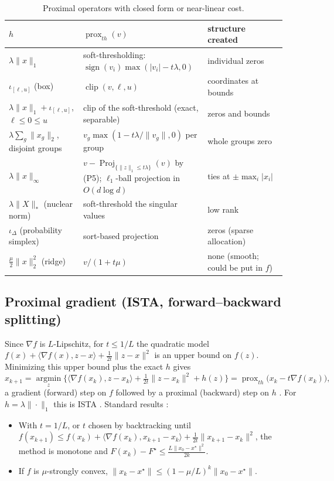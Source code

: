 \documentclass[10pt]{article}
\newcommand{\prox}{\operatorname{prox}}
\newcommand{\proj}{\operatorname{Proj}}
\theoremstyle{remark}
\begin{document}
\begin{table}[h]
\centering\small
\begin{tabular}{@{}L{0.25\linewidth}L{0.42\linewidth}L{0.27\linewidth}@{}}
\toprule
$h$ & $\prox_{th}(v)$ & structure created\\\midrule
$\lambda\|x\|_1$ \citep{tibshirani1996lasso} & soft-thresholding: $\operatorname{sign}(v_i)\max(|v_i|-t\lambda,0)$ & individual zeros\\
$\iota_{[\ell,u]}$ (box) & $\operatorname{clip}(v,\ell,u)$ & coordinates at bounds\\
$\lambda\|x\|_1+\iota_{[\ell,u]}$, $\ell\le0\le u$ & clip of the soft-threshold (exact, separable) & zeros and bounds\\
$\lambda\sum_g\|x_g\|_2$, disjoint groups \citep{yuan2006group} & $v_g\max(1-t\lambda/\|v_g\|,0)$ per group & whole groups zero\\
$\lambda\|x\|_\infty$ & $v-\proj_{\{\|z\|_1\le t\lambda\}}(v)$ by (P5); $\ell_1$-ball projection in $O(d\log d)$ \citep{duchi2008l1ball} & ties at $\pm\max_i|x_i|$\\
$\lambda\|X\|_*$ (nuclear norm) & soft-threshold the singular values \citep{cai2010svt} & low rank\\
$\iota_{\Delta}$ (probability simplex) & sort-based projection \citep{duchi2008l1ball} & zeros (sparse allocation)\\
$\frac{\mu}{2}\|x\|_2^2$ (ridge) & $v/(1+t\mu)$ & none (smooth; could be put in $f$)\\
\bottomrule
\end{tabular}
\caption{Proximal operators with closed form or near-linear cost.}\label{tab:prox}
\end{table}

\subsection{Proximal gradient (ISTA, forward--backward splitting)}
Since $\nabla f$ is $L$-Lipschitz, for $t\le1/L$ the quadratic model
$f(x)+\langle\nabla f(x),z-x\rangle+\frac1{2t}\|z-x\|^2$ is an upper bound on $f(z)$. Minimizing this upper bound plus the exact $h$ gives
\begin{equation}\label{eq:ista}
x_{k+1}=\operatorname*{argmin}_z\Big\{\langle\nabla f(x_k),z-x_k\rangle+\tfrac1{2t}\|z-x_k\|^2+h(z)\Big\}
=\prox_{th}\big(x_k-t\nabla f(x_k)\big),
\end{equation}
a gradient (forward) step on $f$ followed by a proximal (backward) step on $h$ \citep{lions1979,combettes2005}. For $h=\lambda\|\cdot\|_1$
this is ISTA \citep{daubechies2004,beck2009fista}. Standard results \citep{beck2009fista,nesterov2013composite,beck2017book}:
\begin{itemize}
\item With $t=1/L$, or $t$ chosen by backtracking until $f(x_{k+1})\le f(x_k)+\langle\nabla f(x_k),x_{k+1}-x_k\rangle+\frac1{2t}\|x_{k+1}-x_k\|^2$,
the method is monotone and $F(x_k)-F^\star\le \frac{L\|x_0-x^\star\|^2}{2k}$.
\item If $f$ is $\mu$-strongly convex, $\|x_k-x^\star\|\le(1-\mu/L)^k\|x_0-x^\star\|$.
\end{itemize}
\end{document}
